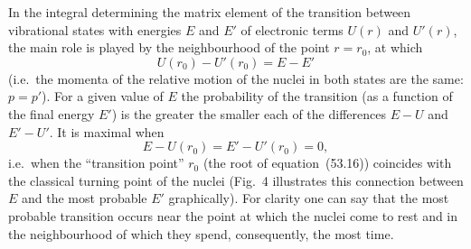In the integral determining the matrix element of the transition between vibrational states with energies $E$ and $E'$ of electronic terms $U(r)$ and $U'(r)$, the main role is played by the neighbourhood of the point $r = r_0$, at which
\begin{equation}
U(r_0) - U'(r_0) = E - E'
\tag{53.16}
\end{equation}
(i.e.\ the momenta of the relative motion of the nuclei in both states are the same: $p = p'$). For a given value of $E$ the probability of the transition (as a function of the final energy $E'$) is the greater the smaller each of the differences $E - U$ and $E' - U'$. It is maximal when
\begin{equation}
E - U(r_0) = E' - U'(r_0) = 0,
\tag{53.17}
\end{equation}
i.e.\ when the ``transition point'' $r_0$ (the root of equation~(53.16)) coincides with the classical turning point of the nuclei (Fig.~4 illustrates this connection between $E$ and the most probable $E'$ graphically). For clarity one can say that the most probable transition occurs near the point at which the nuclei come to rest and in the neighbourhood of which they spend, consequently, the most time.
